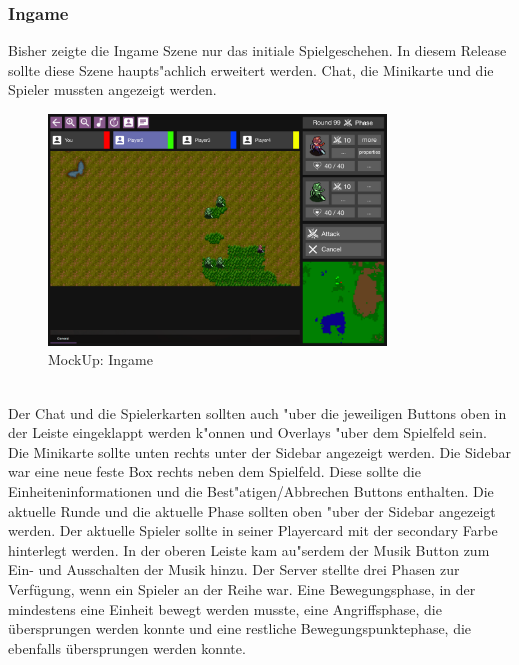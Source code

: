 \documentclass[12pt, titlepage]{scrartcl}
\newcounter{subsubsubsection}[subsubsection]
\begin{document}
		    \subsubsection{Ingame}
		        Bisher zeigte die Ingame Szene nur das initiale Spielgeschehen. In diesem Release sollte diese Szene haupts"achlich erweitert werden. Chat, die Minikarte und die Spieler mussten angezeigt werden. \\
		        \begin{figure}[H] 
    				\centering
    				\includegraphics[width=0.8\textwidth]{images/mockUps/Ingame.png}
    				\caption{MockUp: Ingame}
    				\label{Ingame_View}
			    \end{figure}
		    	\ \\   Der Chat und die Spielerkarten sollten auch "uber die jeweiligen Buttons oben in der Leiste eingeklappt werden k"onnen und Overlays "uber dem Spielfeld sein. Die Minikarte sollte unten rechts unter der Sidebar angezeigt werden. Die Sidebar war eine neue feste Box rechts neben dem Spielfeld. Diese sollte die Einheiteninformationen und die Best"atigen/Abbrechen Buttons enthalten. Die aktuelle Runde und die aktuelle Phase sollten oben "uber der Sidebar angezeigt werden. Der aktuelle Spieler sollte in seiner Playercard mit der secondary Farbe hinterlegt werden. In der oberen Leiste kam au"serdem der Musik Button zum Ein- und Ausschalten der Musik hinzu.
			        Der Server stellte drei Phasen zur Verf\"ugung, wenn ein Spieler an der Reihe war. Eine Bewegungsphase, in der mindestens eine Einheit bewegt werden musste, eine Angriffsphase, die \"ubersprungen werden konnte und eine restliche Bewegungspunktephase, die ebenfalls \"ubersprungen werden konnte. \\
\end{document}
